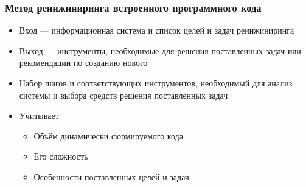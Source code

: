 \documentclass{beamer}
\begin{document}


\begin{frame}[t]
    \transwipe[direction=90]
    \frametitle{Метод реинжиниринга встроенного программного кода}
    \begin{itemize}        
        \item Вход --- информационная система и список целей и задач реинжиниринга
        \item Выход --- инструменты, необходимые для решения поставленных задач или рекомендации по созданию нового
        \item Набор шагов и соответствующих инструментов, необходимый для анализ системы и выбора средств решения поставленных задач
        \item Учитывает
            \begin{itemize}
              \item Объём динамически формируемого кода
              \item Его сложность
              \item Особенности поставленных целей и задач
            \end{itemize}
    \end{itemize}
\end{frame}
\end{document}
